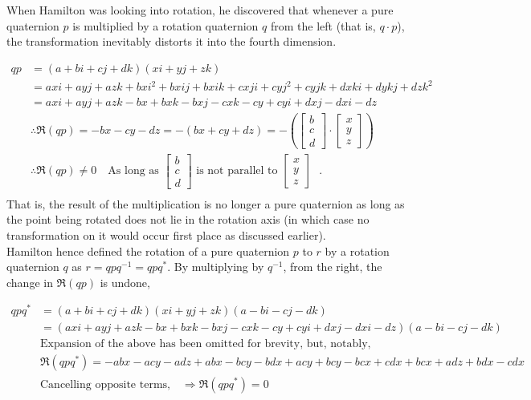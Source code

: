 \documentclass[12pt, a4paper]{article}
\begin{document}
When Hamilton was looking into rotation, he discovered that whenever a pure
quaternion $p$ is multiplied by a rotation quaternion $q$ from the left (that
is, $q \cdot p$), the transformation inevitably distorts it into the fourth
dimension.

\begin{align*}
    qp &= (a + bi + cj + dk)(xi + yj + zk) \\ 
    &= axi + ayj + azk + bxi^2 + bxij + bxik + cxji + cyj^2 + cyjk + dxki + dykj + dzk^2 \\
    &= axi + ayj + azk - bx + bxk - bxj - cxk - cy + cyi + dxj - dxi - dz \\
    &\therefore \Re(qp) = - bx - cy - dz = -(bx + cy + dz) = -\left(\begin{bmatrix}
        b \\ c \\ d
    \end{bmatrix} \cdot \begin{bmatrix}
        x \\ y \\ z
    \end{bmatrix}\right) \\
    &\therefore \Re(qp) \neq 0 \quad \text{As long as $\begin{bmatrix}
        b \\ c \\ d
    \end{bmatrix}$ is not parallel to $\begin{bmatrix}
        x \\ y \\ z
    \end{bmatrix}$ }. \\
\end{align*}
That is, the result of the multiplication is no longer a pure quaternion as long
as the point being rotated does not lie in the rotation axis (in which case no
transformation on it would occur first place as discussed earlier). \\

Hamilton hence defined the rotation of a pure quaternion $p$ to $r$ by a
rotation quaternion $q$ as $r = qpq^{-1} = qpq^*$. By multiplying by $q^{-1}$, from the
right, the change in $\Re(qp)$ is undone,

\begin{align*}
    qpq^* &= (a + bi + cj + dk)(xi + yj + zk)(a - bi - cj - dk) \\
    &= (axi + ayj + azk - bx + bxk - bxj - cxk - cy + cyi + dxj - dxi - dz)(a - bi - cj - dk) \\
    &\text{Expansion of the above has been omitted for brevity, but, notably,} \\
    &\Re(qpq^*) = -abx - acy - adz + abx - bcy - bdx + acy + bcy - bcx + cdx + bcx + adz + bdx - cdx\\
    &\text{Cancelling opposite terms,} \quad \Rightarrow\Re(qpq^*) = 0 \\
\end{align*}
\end{document}
